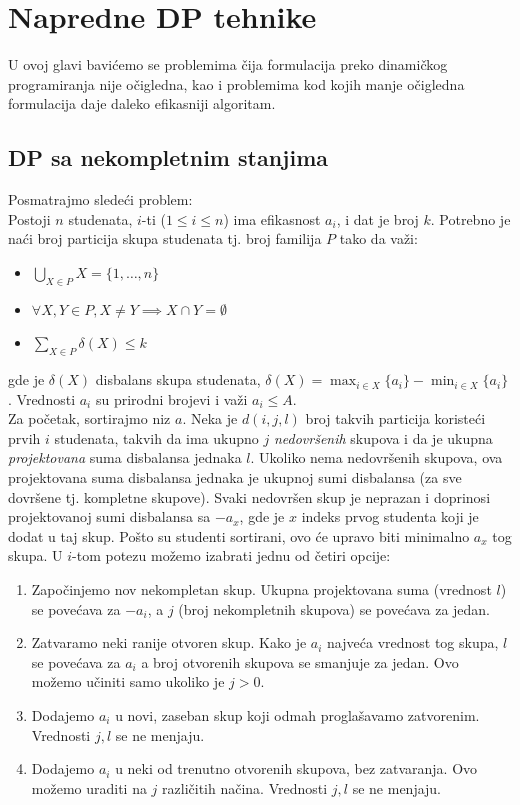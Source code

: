 \documentclass[a4paper,12pt]{article}
\numberwithin{equation}{subsection}
\begin{document}
\section{Napredne DP tehnike}

U ovoj glavi bavi\' cemo se problemima \v cija formulacija preko dinami\v ckog programiranja nije o\v cigledna, kao i problemima kod kojih manje o\v cigledna formulacija daje daleko efikasniji algoritam.

\subsection{DP sa nekompletnim stanjima}

Posmatrajmo slede\' ci problem:
\\

Postoji $n$ studenata, $i$-ti ($1\leq i \leq n$) ima efikasnost $a_i$, i dat je broj $k$. Potrebno je na\' ci broj particija skupa studenata tj. broj familija $P$ tako da va\v zi:
\begin{itemize}
\item $\bigcup_{X \in P} X = \{1,\ldots,n\}$
\item $\forall X, Y \in P, X \neq Y \implies X \cap Y = \emptyset$
\item $\sum_{X \in P} \delta(X) \leq k$
\end{itemize}
gde je $\delta(X)$ disbalans skupa studenata, $\delta(X) = \max_{i \in X} \{ a_i \} - \min_{i \in X} \{ a_i \}$. Vrednosti $a_i$ su prirodni brojevi i va\v zi $a_i \leq A$.
\\

Za po\v cetak, sortirajmo niz $a$. Neka je $d(i, j, l)$ broj takvih particija koriste\' ci prvih $i$ studenata, takvih da ima ukupno $j$ \textit{nedovr\v senih} skupova i da je ukupna \textit{projektovana} suma disbalansa jednaka $l$. Ukoliko nema nedovr\v senih skupova, ova projektovana suma disbalansa jednaka je ukupnoj sumi disbalansa (za sve dovr\v sene tj. kompletne skupove). Svaki nedovr\v sen skup je neprazan i doprinosi projektovanoj sumi disbalansa sa $-a_x$, gde je $x$ indeks prvog studenta koji je dodat u taj skup. Po\v sto su studenti sortirani, ovo \' ce upravo biti minimalno $a_x$ tog skupa. U $i$-tom potezu mo\v zemo izabrati jednu od \v cetiri opcije:
\begin{enumerate}
\item Zapo\v cinjemo nov nekompletan skup. Ukupna projektovana suma (vrednost $l$) se pove\' cava za $-a_i$, a $j$ (broj nekompletnih skupova) se pove\' cava za jedan.
\item Zatvaramo neki ranije otvoren skup. Kako je $a_i$ najve\' ca vrednost tog skupa, $l$ se pove\' cava za $a_i$ a broj otvorenih skupova se smanjuje za jedan. Ovo mo\v zemo u\v ciniti samo ukoliko je $j > 0$.
\item Dodajemo $a_i$ u novi, zaseban skup koji odmah progla\v savamo zatvorenim. Vrednosti $j,l$ se ne menjaju.
\item Dodajemo $a_i$ u neki od trenutno otvorenih skupova, bez zatvaranja. Ovo mo\v zemo uraditi na $j$ razli\v citih na\v cina. Vrednosti $j,l$ se ne menjaju.
\end{enumerate}
\end{document}
